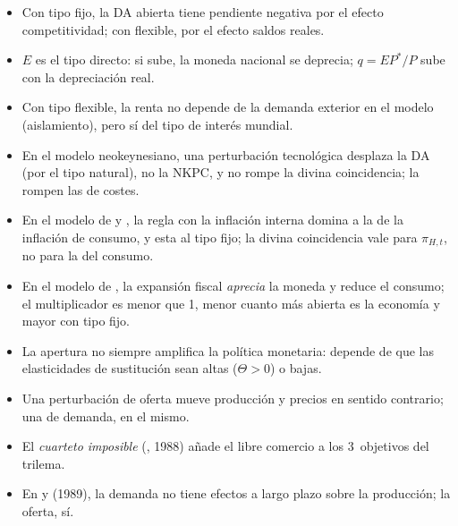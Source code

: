 \documentclass[11pt]{article}
\begin{document}
\begin{itemize}
\begin{itemize}
  \item Con tipo fijo, la DA abierta tiene pendiente negativa por el efecto competitividad; con flexible, por el efecto saldos reales.
  \item $E$ es el tipo directo: si sube, la moneda nacional se deprecia; $q=EP^*/P$ sube con la depreciación real.
  \item Con tipo flexible, la renta no depende de la demanda exterior en el modelo (aislamiento), pero sí del tipo de interés mundial.
  \item En el modelo neokeynesiano, una perturbación tecnológica desplaza la DA (por el tipo natural), no la NKPC, y no rompe la divina coincidencia; la rompen las de costes.
  \item En el modelo de  y , la regla con la inflación interna domina a la de la inflación de consumo, y esta al tipo fijo; la divina coincidencia vale para $\pi_{H,t}$, no para la del consumo.
  \item En el modelo de , la expansión fiscal \emph{aprecia} la moneda y reduce el consumo; el multiplicador es menor que 1, menor cuanto más abierta es la economía y mayor con tipo fijo.
  \item La apertura no siempre amplifica la política monetaria: depende de que las elasticidades de sustitución sean altas ($\Theta>0$) o bajas.
  \item Una perturbación de oferta mueve producción y precios en sentido contrario; una de demanda, en el mismo.
  \item El \emph{cuarteto imposible} (, 1988) añade el libre comercio a los 3~objetivos del trilema.
  \item En  y  (1989), la demanda no tiene efectos a largo plazo sobre la producción; la oferta, sí.
  \end{itemize}
\end{itemize}

\bibliografia
\end{document}
